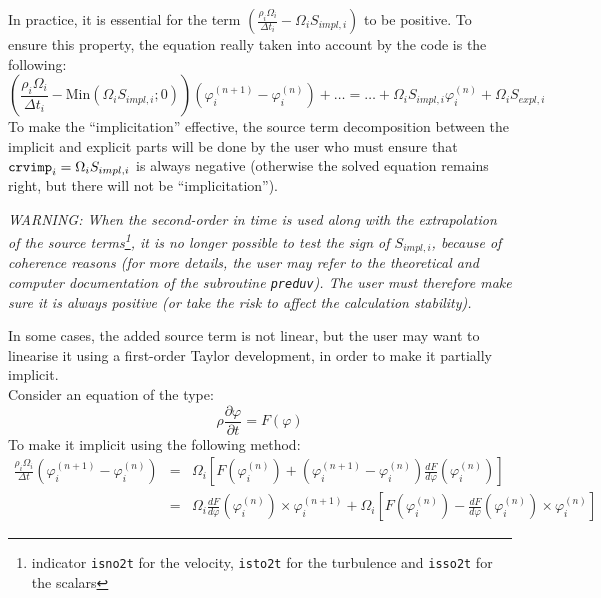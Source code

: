 {{{In practice, it is essential for the term
$\displaystyle \left(\frac{\rho_i\Omega_i}{\Delta
t_i}-\Omega_iS_{impl,i}\right)$ to be positive. To ensure this property,
the equation really taken into account by the code is the following:
\begin{displaymath}
\left(\frac{\rho_i\Omega_i}{\Delta t_i}-
\text{Min}(\Omega_iS_{impl,i};0)\right)
\left(\varphi_i^{(n+1)}-\varphi_i^{(n)}\right)
+\ldots = \ldots + \Omega_iS_{impl,i}\varphi_i^{(n)} + \Omega_iS_{expl,i}
\end{displaymath}
To make the ``implicitation'' effective, the source term decomposition
between the implicit and explicit parts will be done by the user who must
ensure that $\text{\texttt{crvimp}}_i=\Omega_iS_{impl,i}$ is always negative
(otherwise the solved equation remains right, but there will not be
``implicitation'').

{\em WARNING: When the second-order in time is used along with the extrapolation of the
source terms\footnote{indicator \texttt{isno2t} for the velocity,
\texttt{isto2t} for the turbulence and \texttt{isso2t} for the scalars}, it is no longer possible to test the sign of $S_{impl,i}$,
because of coherence reasons (for more details, the user may refer to
the theoretical and computer documentation \cite{theory} of the
subroutine \texttt{preduv}). The user must therefore make sure it is
always positive (or take the risk to affect the calculation stability).}


In some cases, the added source term is not linear, but the user may
want to linearise it using a first-order Taylor development, in order to
make it partially implicit.\\
Consider an equation of the type:
\begin{displaymath}
\rho\frac{\partial\varphi}{\partial t}=F(\varphi)
\end{displaymath}
To make it implicit using the following method:
\begin{eqnarray*}
\frac{\rho_i\Omega_i}{\Delta t}\left(\varphi_i^{(n+1)}-\varphi_i^{(n)}\right) & = &
\Omega_i\left[F(\varphi_i^{(n)})+\left(\varphi_i^{(n+1)}-\varphi_i^{(n)}\right)
\frac{dF}{d\varphi}(\varphi_i^{(n)})\right]\\
& = & \Omega_i\frac{dF}{d\varphi}(\varphi_i^{(n)})\times\varphi_i^{(n+1)}
+\Omega_i\left[F(\varphi_i^{(n)})-\frac{dF}{d\varphi}(\varphi_i^{(n)})
\times\varphi_i^{(n)}\right]
\end{eqnarray*}

}}}
